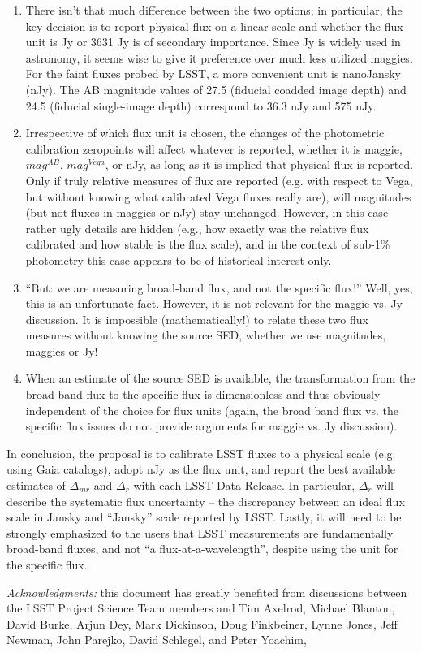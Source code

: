 \documentclass{emulateapj}
\begin{document}
\begin{enumerate}
\item There isn't that much difference between the two options; in particular,  the key 
decision is to report physical flux on a linear scale and whether the flux unit is Jy 
or 3631 Jy is of secondary importance.  Since Jy is widely used in astronomy, it seems 
wise to give it preference over much less utilized maggies. For the faint fluxes
probed by LSST, a more convenient unit is nanoJansky (nJy). The AB magnitude 
values of 27.5 (fiducial coadded image depth)  and 24.5 (fiducial single-image depth) 
correspond to 36.3 nJy and 575 nJy. 

\item Irrespective of which flux unit is chosen, the changes of the photometric 
calibration zeropoints will affect whatever is reported, whether it is maggie, $mag^{AB}$, 
$mag^{Vega}$, or nJy, as long as it is implied that physical flux is reported. Only if
truly relative measures of flux are reported (e.g. with respect to Vega, but without knowing 
what calibrated Vega fluxes really are), will magnitudes (but not fluxes in maggies or 
nJy) stay unchanged. However, in this case rather ugly details are hidden (e.g., how 
exactly was the relative flux calibrated and how stable is the flux scale), and in the context 
of sub-1\% photometry this case appears to be of historical interest only. 
\item ``But: we are measuring broad-band flux, and not the specific flux!''  Well, 
yes, this is an unfortunate fact. However, it is not relevant for the maggie vs. Jy discussion. 
It is impossible (mathematically!) to relate these two flux measures without knowing 
the source SED, whether we use magnitudes, maggies or Jy! 
\item When an estimate of the source SED is available, the transformation from
the broad-band flux to the specific flux is dimensionless and thus obviously independent 
of the choice for flux units (again, the broad band flux vs. the specific flux issues do not provide
arguments for maggie vs. Jy discussion).
\end{enumerate}

In conclusion, the proposal is to calibrate LSST fluxes to a physical scale (e.g. using
Gaia catalogs), adopt nJy as the flux unit, and report the best available estimates of 
$\Delta_{mr}$ and $\Delta_r$ with each LSST Data Release. In particular, $\Delta_r$ 
will describe the systematic flux uncertainty --  the discrepancy between an ideal 
flux scale in Jansky and ``Jansky'' scale reported by LSST. Lastly, it  will need to be
strongly emphasized to the users that LSST measurements are fundamentally broad-band 
fluxes, and not ``a flux-at-a-wavelength'', despite using the unit for the specific flux. 


\vskip 0.5in
{\it Acknowledgments:} this document has greatly benefited from discussions between
the LSST Project Science Team members and Tim Axelrod, Michael Blanton, David 
Burke, Arjun Dey, Mark Dickinson, Doug Finkbeiner, Lynne Jones,  Jeff Newman, 
John Parejko, David Schlegel, and Peter Yoachim,
\end{document}
